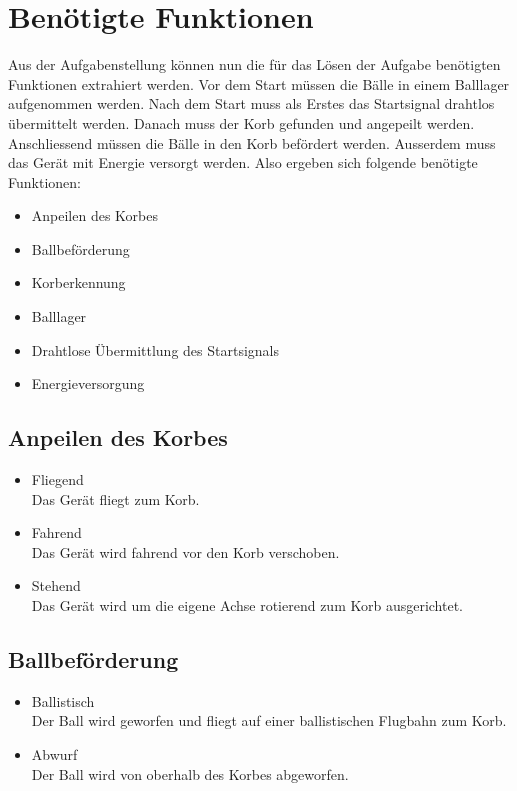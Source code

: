 \section{Benötigte Funktionen}
Aus der Aufgabenstellung können nun die für das Lösen der Aufgabe benötigten 
Funktionen extrahiert werden. Vor dem Start müssen die Bälle in einem Balllager 
aufgenommen werden. Nach dem Start muss als Erstes das Startsignal drahtlos 
übermittelt werden. Danach muss der Korb gefunden und angepeilt werden. 
Anschliessend müssen die Bälle in den Korb befördert werden. Ausserdem muss 
das Gerät mit Energie versorgt werden. Also ergeben sich folgende benötigte 
Funktionen: 
\begin{itemize}
    \item Anpeilen des Korbes
    \item Ballbeförderung
    \item Korberkennung
    \item Balllager
    \item Drahtlose Übermittlung des Startsignals
    \item Energieversorgung
\end{itemize}

\subsection{Anpeilen des Korbes}
\begin{itemize}
    \item Fliegend \\
        Das Gerät fliegt zum Korb. 
    \item Fahrend \\
        Das Gerät wird fahrend vor den Korb verschoben. 
    \item Stehend \\
        Das Gerät wird um die eigene Achse rotierend zum Korb ausgerichtet. 
\end{itemize}

\subsection{Ballbeförderung}
\begin{itemize}
    \item Ballistisch \\
        Der Ball wird geworfen und fliegt auf einer ballistischen Flugbahn zum 
        Korb. 
    \item Abwurf \\
        Der Ball wird von oberhalb des Korbes abgeworfen. 
\end{itemize}

